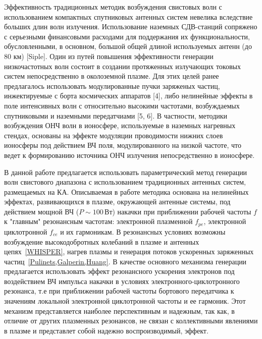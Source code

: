 \documentclass[autoref,10pt]{disser}
\begin{document}
Эффективность традиционных методик возбуждения свистовых волн с использованием компактных спутниковых антенных систем невелика вследствие больших длин волн излучения.  Использование наземных СДВ-станций сопряжено с  серьезными финансовыми расходами для поддержания их функциональности, обусловленными, в основном,  большой общей длиной используемых антенн (до 80 км) [Siple].
Один из путей повышения эффективности генерации низкочастотных волн состоит в создании протяженных излучающих токовых систем непосредственно  в околоземной плазме. Для этих целей ранее предлагалось использовать модулированные пучки заряженых частиц, инжектируемые с борта космических аппаратов [4], либо нелинейные эффекты в поле интенсивных волн с относительно высокими частотами, возбуждаемых спутниковыми и наземными передатчиами [5, 6]. В частности, методики возбуждения ОНЧ волн в ионосфере, используемые в наземных нагревных стендах, основаны на эффекте модуляции проводимости нижних слоев ионосферы под действием ВЧ поля, модулированного на низкой частоте, что ведет к формированию источника ОНЧ излучения непосредственно в ионосфере.

В данной работе  предлагается использовать параметрический метод генерации волн свистового диапазона с использованием традиционных антенных систем, размещаемых на КА. Описываемая в работе методика основана  на  нелинейных эффектах, развивающихся в плазме, окружающей антенные системы, под действием мощной ВЧ ($P\sim100$\,Вт) накачки  при приближении рабочей частоты $f$ к "главным" резонансным частотам: электронной плазменной $f_{pe}$, электронной циклотронной $f_{ce}$ и их гармоникам. В резонансных условиях возможны возбуждение высокодобротных колебаний в плазме и антенных цепях~\ref{WHISPER}, нагрев плазмы и генерация потоков ускоренных заряженных частиц~\ref{Pulinets,Galperin,Huang}.
В качестве основного механизма генерации предлагается использовать эффект резонансного ускорения электронов под воздействием ВЧ импульса накачки в условиях электронного-циклотронного резонанса, т.е при приближении рабочей частоты бортового передатчика к значениям локальной электронной циклотронной частоты и ее гармоник.  Этот механизм представляется наиболее перспективным и надежным, так как, в отличие от других плазменных резонансов, не связан с  коллективными явлениями в плазме и представлет собой надежно воспроизводимый, эффект. 
\end{document}
